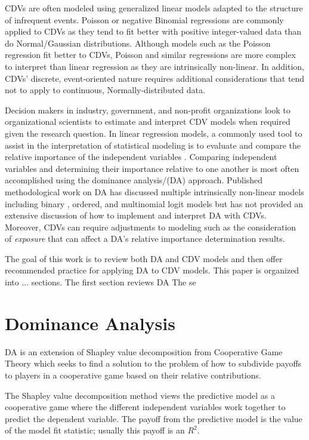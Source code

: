 \documentclass[ShortAfour,times,sageapa]{sagej}
\begin{document}
	
	CDVs are often modeled using generalized linear models adapted to the structure of infrequent events.
	Poisson or negative Binomial regressions \cite{} are commonly applied to CDVs as they tend to fit better with positive integer-valued data than do Normal/Gaussian distributions.  
	Although models such as the Poisson regression fit better to CDVs, Poisson and similar regressions are more complex to interpret than linear regression as they are intrinsically non-linear.
	In addition, CDVs' discrete, event-oriented nature requires additional considerations that tend not to apply to continuous, Normally-distributed data.
	
	
	Decision makers in industry, government, and non-profit organizations look to organizational scientists to estimate and interpret CDV models when required given the research question. 
	In linear regression models, a commonly used tool to assist in the interpretation of statistical modeling is to evaluate and compare the relative importance of the independent variables \cite{}. 
	Comparing independent variables and determining their importance relative to one another is most often accomplished using the dominance analysis/(DA) \cite{} approach. 
	Published methodological work on DA has discussed multiple intrinsically non-linear models including binary \cite{}, ordered, and multinomial logit \cite{} models but has not provided an extensive discussion of how to implement and interpret DA with CDVs.  
	Moreover, CDVs can require adjustments to modeling such as the consideration of \textit{exposure} that can affect a DA's relative importance determination results.
	
	
	The goal of this work is to review both DA and CDV models and then offer recommended practice for applying DA to CDV models.
	This paper is organized into ... sections.  
	The first section reviews DA
	The se
		
\section{Dominance Analysis}
	
	DA is an extension of Shapley value decomposition from Cooperative Game Theory %
	\cite{} which seeks to find a solution to the problem of how to subdivide payoffs to players in a cooperative game based on their relative contributions.
	
	
	The Shapley value decomposition method views the predictive model as a cooperative game where the different independent variables work together to predict the dependent variable.  
	The payoff from the predictive model is the value of the model fit statistic; usually this payoff is an $R^2$. %
	
\end{document}
